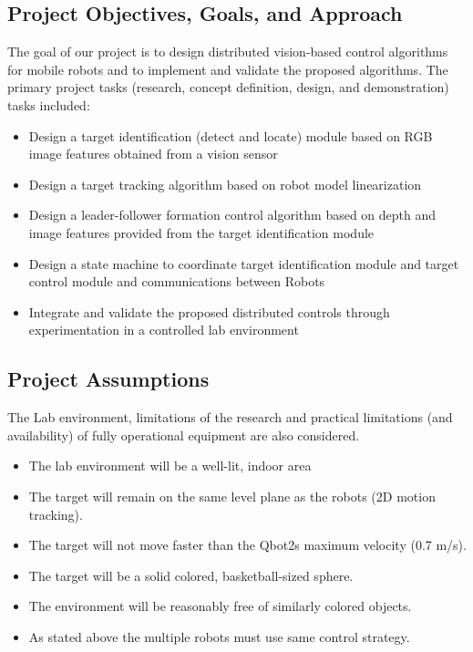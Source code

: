 \documentclass[conference]{IEEEtran}
\begin{document}
\subsection{Project Objectives, Goals, and Approach}
The goal of our project is to design distributed vision-based control algorithms for mobile robots and to implement and validate the proposed algorithms. The primary project tasks (research, concept definition, design, and demonstration) tasks included:

\begin{itemize}
\item	Design a target identification (detect and locate) module based on RGB image features obtained from a vision sensor
\item	Design a target tracking algorithm based on robot model linearization
\item	Design a leader-follower formation control algorithm based on depth and image features provided from the target identification module 
\item	Design a state machine to coordinate target identification module and target control module and communications between Robots
\item	Integrate and validate the proposed distributed controls through experimentation in a controlled lab environment
\end{itemize}


\subsection{Project Assumptions}
The Lab environment, limitations of the research and practical limitations (and availability) of fully operational equipment are also considered.  

\begin{itemize}
\item	The lab environment will be a well-lit, indoor area
\item	The target will remain on the same level plane as the robots (2D motion tracking).  
\item	The target will not move faster than the Qbot2s maximum velocity (0.7 m/s).  
\item	The target will be a solid colored, basketball-sized sphere.  
\item	The environment will be reasonably free of similarly colored objects.  
\item	As stated above the multiple robots must use same control strategy.

\end{itemize}
\end{document}
